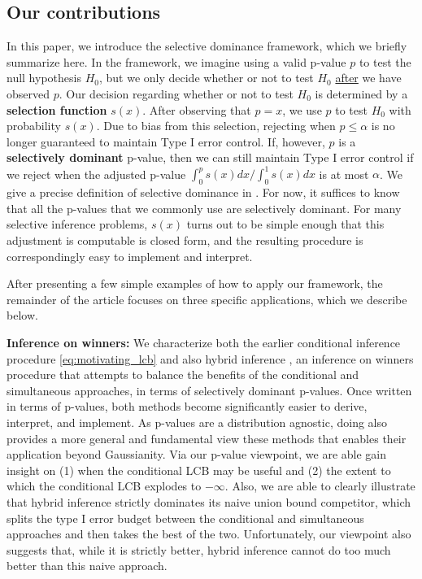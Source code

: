 \documentclass{article}
\begin{document}
\subsection{Our contributions}

In this paper, we introduce the selective dominance framework, which we briefly summarize here. In the framework, we imagine using a valid p-value $p$ to test the null hypothesis $H_0$, but we only decide whether or not to test $H_0$ \underline{after} we have observed $p$. Our decision regarding whether or not to test $H_0$ is determined by a \textbf{selection function} $s(x)$. After observing that $p=x$, we use $p$ to test $H_0$ with probability $s(x)$. Due to bias from this selection, rejecting when $p \leq \alpha$ is no longer guaranteed to maintain Type I error control. If, however, $p$ is a \textbf{selectively dominant} p-value, then we can still maintain Type I error control if we reject when the adjusted p-value $\int_0^p s(x) dx/\int_0^1 s(x) dx$ is at most $\alpha$. We give a precise definition of selective dominance in . For now, it suffices to know that all the p-values that we commonly use are selectively dominant. For many selective inference problems, $s(x)$ turns out to be simple enough that this adjustment is computable is closed form, and the resulting procedure is correspondingly easy to implement and interpret. 

After presenting a few simple examples of how to apply our framework, the remainder of the article focuses on three specific applications, which we describe below. \newline 

\noindent \textbf{Inference on winners: } We characterize both the earlier conditional inference procedure \eqref{eq:motivating_lcb} and also hybrid inference \cite{Andrews2023}, an inference on winners procedure that attempts to balance the benefits of the conditional and simultaneous approaches, in terms of selectively dominant p-values. Once written in terms of p-values, both methods become significantly easier to derive, interpret, and implement. As p-values are a distribution agnostic, doing also provides a more general and fundamental view these methods that enables their application beyond Gaussianity. Via our p-value viewpoint, we are able gain insight on (1) when the conditional LCB may be useful and (2) the extent to which the conditional LCB explodes to $-\infty$. Also, we are able to clearly illustrate that hybrid inference strictly dominates its naive union bound competitor, which splits the type I error budget between the conditional and simultaneous approaches and then takes the best of the two. Unfortunately, our viewpoint also suggests that, while it is strictly better, hybrid inference cannot do too much better than this naive approach.\newline 
\end{document}
